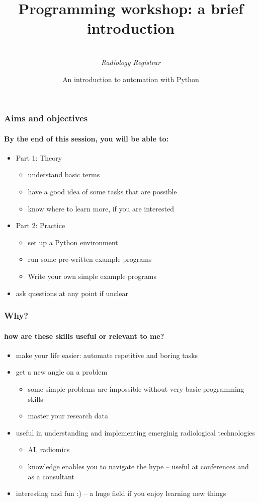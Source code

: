 \documentclass{beamer}
\title[Programming workshop]{Programming workshop: a brief introduction}
\author{
	\sc{Mark Thurston}\\
    \textit{Radiology Registrar}
}
\institute{
	\textit{Peninsula Radiology Academy}\\
    \textit{Plymouth}
}
\date[April 2018]{An introduction to automation with Python} %
\begin{document}
    \begin{frame}[plain]
	    \titlepage
    \end{frame}


    \begin{frame}
	    \frametitle{Aims and objectives}
	    \framesubtitle{By the end of this session, you will be able to:}

	    \begin{itemize}
		    \item Part 1: Theory
			    \begin{itemize}
				    \item understand basic terms
				    \item have a good idea of some tasks that are possible
				    \item know where to learn more, if you are interested
			    \end{itemize}
	    \end{itemize}
	    \begin{itemize}
		    \item Part 2: Practice
			    \begin{itemize}
				    \item set up a Python environment
				    \item run some pre-written example programs
				    \item Write your own simple example programs
			    \end{itemize}
	    \end{itemize}
	    \begin{itemize}
		    \item ask questions at any point if unclear
	    \end{itemize}
    \end{frame}

    \begin{frame}
	    \frametitle{Why?}
	    \framesubtitle{how are these skills useful or relevant to me?}
	    \begin{itemize}
		    \item make your life easier: automate repetitive and boring tasks
		    \item get a new angle on a problem
			    \begin{itemize}
				    \item some simple problems are impossible without very basic programming skills
				    \item master your research data
			    \end{itemize}
		    \item useful in understanding and implementing emerginig radiological technologies
			    \begin{itemize}
				    \item AI, radiomics
				    \item knowledge enables you to navigate the hype -- useful at conferences and as a consultant
			    \end{itemize}
		    \item interesting and fun :) -- a huge field if you enjoy learning new things
	    \end{itemize}
    \end{frame}
\end{document}
